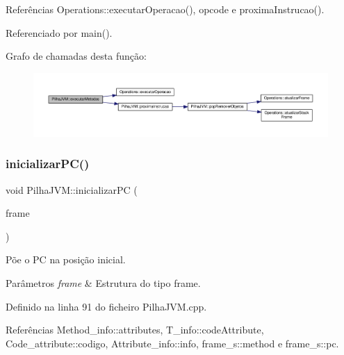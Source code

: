 Referências Operations\+::executar\+Operacao(), opcode e proxima\+Instrucao().



Referenciado por main().

Grafo de chamadas desta função\+:\nopagebreak
\begin{figure}[H]
\begin{center}
\leavevmode
\includegraphics[width=350pt]{classPilhaJVM_a8c87f8255b289be137dd09360d135e86_cgraph}
\end{center}
\end{figure}
\mbox{\label{classPilhaJVM_a08adb78983b512cf3d97becfa2e9a5f0}} 
\subsubsection{\texorpdfstring{inicializar\+P\+C()}{inicializarPC()}}
{\footnotesize\ttfamily void Pilha\+J\+V\+M\+::inicializar\+PC (\begin{DoxyParamCaption}\item[{\hyperlink{PilhaJVM_8h_acc380914b41a084dcc8e4b38fb200145}{Frame} $\ast$}]{frame }\end{DoxyParamCaption})\hspace{0.3cm}{\ttfamily [private]}}



Põe o PC na posição inicial. 


\begin{DoxyParams}{Parâmetros}
{\em frame} & Estrutura do tipo frame. \\
\hline
\end{DoxyParams}


Definido na linha 91 do ficheiro Pilha\+J\+V\+M.\+cpp.



Referências Method\+\_\+info\+::attributes, T\+\_\+info\+::code\+Attribute, Code\+\_\+attribute\+::codigo, Attribute\+\_\+info\+::info, frame\+\_\+s\+::method e frame\+\_\+s\+::pc.



